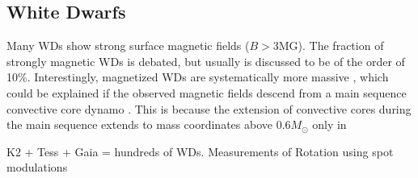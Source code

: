 {\color{red} \subsection{White Dwarfs}}
Many WDs show strong surface magnetic fields ($B>$3MG). The fraction of strongly magnetic WDs is debated, but usually is discussed to be of the order of 10\%. Interestingly, magnetized WDs are systematically more massive \cite{Ferrario_2015}, which could be explained if the observed magnetic fields descend from a main sequence convective core dynamo \cite{Cantiello_2016}. This is because the extension of convective cores during the main sequence extends to mass coordinates above 0.6$M_\odot$ only in  

K2 + Tess + Gaia = hundreds of WDs. Measurements of Rotation using spot modulations